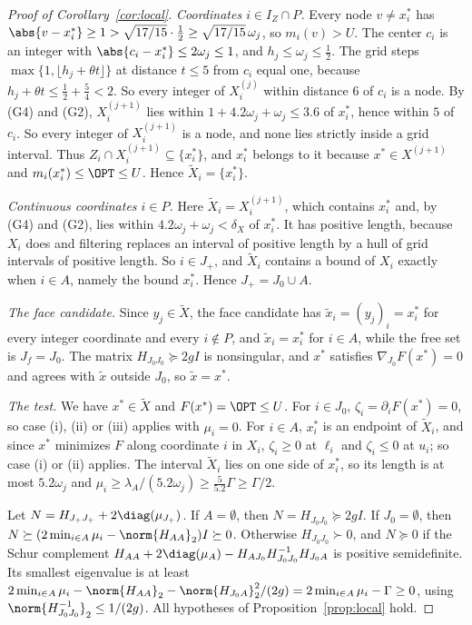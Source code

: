 \begin{proof}[Proof of Corollary~\ref{cor:local}]
\emph{Coordinates $i\in I_Z\cap P$.} Every node $v\ne x^*_i$ has
$\abs{v-x^*_i}\ge1>\sqrt{17/15}\cdot\frac12\ge\sqrt{17/15}\,\omega_j$, so
$m_i(v)>U$. The center $c_i$ is an integer with $\abs{c_i-x^*_i}\le2\omega_j\le1$,
and $h_j\le\omega_j\le\frac12$. The grid steps
$\max\{1,\lfloor h_j+\theta t\rfloor\}$ at distance $t\le5$ from $c_i$ equal
one, because $h_j+\theta t\le\frac12+\frac54<2$. So every integer of
$X^{(j)}_i$ within distance $6$ of $c_i$ is a node. By (G4) and (G2),
$X^{(j+1)}_i$ lies within $1+4.2\omega_j+\omega_j\le3.6$ of $x^*_i$, hence within
$5$ of $c_i$. So every integer of $X^{(j+1)}_i$ is a node, and none lies
strictly inside a grid interval. Thus
$Z_i\cap X^{(j+1)}_i\subseteq\{x^*_i\}$, and $x^*_i$ belongs to it because
$x^*\in X^{(j+1)}$ and $m_i(x^*_i)\le\OPT\le U$. Hence $\tilde X_i=\{x^*_i\}$.

\emph{Continuous coordinates $i\in P$.} Here $\tilde X_i=X^{(j+1)}_i$, which
contains $x^*_i$ and, by (G4) and (G2), lies within
$4.2\omega_j+\omega_j<\delta_X$ of $x^*_i$. It has positive length, because
$X_i$ does and filtering replaces an interval of positive length by a hull of
grid intervals of positive length. So $i\in J_+$, and
$\tilde X_i$ contains a bound of $X_i$ exactly when $i\in A$, namely
the bound $x^*_i$. Hence $J_+=J_0\cup A$.

\emph{The face candidate.} Since $y_j\in\tilde X$, the face candidate has
$\tilde x_i=(y_j)_i=x^*_i$ for every integer coordinate and every $i\notin P$,
and $\tilde x_i=x^*_i$ for $i\in A$, while the free set is $J_f=J_0$.
The matrix $H_{J_0J_0}\succeq2gI$ is nonsingular, and $x^*$ satisfies
$\nabla_{J_0}F(x^*)=0$ and agrees with $\tilde x$ outside $J_0$, so
$\tilde x=x^*$.

\emph{The test.} We have $x^*\in\tilde X$ and $F(x^*)=\OPT\le U$. For
$i\in J_0$, $\zeta_i=\partial_iF(x^*)=0$, so case (i), (ii) or (iii) applies
with $\mu_i=0$. For $i\in A$, $x^*_i$ is an endpoint of $\tilde X_i$,
and since $x^*$ minimizes $F$ along coordinate $i$ in $X_i$, $\zeta_i\ge0$ at
$\ell_i$ and $\zeta_i\le0$ at $u_i$; so case (i) or (ii) applies. The interval
$\tilde X_i$ lies on one side of $x^*_i$, so its length is at most $5.2\omega_j$
and $\mu_i\ge\lambda_A/(5.2\omega_j)\ge\frac{5}{5.2}\Gamma\ge\Gamma/2$.

Let $N=H_{J_+J_+}+2\diag(\mu_{J_+})$. If $A=\emptyset$, then
$N=H_{J_0J_0}\succeq2gI$. If $J_0=\emptyset$, then
$N\succeq(2\min_{i\in A}\mu_i-\norm{H_{AA}}_2)I\succeq0$.
Otherwise $H_{J_0J_0}\succ0$, and $N\succeq0$ if the Schur complement
$H_{AA}+2\diag(\mu_{A})
-H_{AJ_0}H_{J_0J_0}^{-1}H_{J_0A}$ is positive semidefinite.
Its smallest eigenvalue is at least
$2\min_{i\in A}\mu_i-\norm{H_{AA}}_2
-\norm{H_{J_0A}}_2^2/(2g)=2\min_{i\in A}\mu_i-\Gamma\ge0$, using
$\norm{H_{J_0J_0}^{-1}}_2\le1/(2g)$. All hypotheses of
Proposition~\ref{prop:local} hold.


\end{proof}
